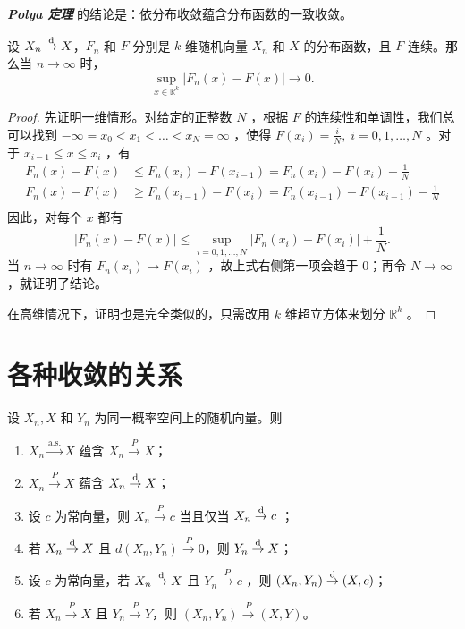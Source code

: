 \textbf{\emph{Polya 定理 }}的结论是：依分布收敛蕴含分布函数的一致收敛。

\begin{theorem}[Pólya 定理]\label{thm:ch1:polya}

\label{thm:ch1:1-5}

设 $X_n \overset{\rm d}\to X$，$F_n$ 和 $F$ 分别是 $k$ 维随机向量 $X_n$ 和 $X$ 的分布函数，且 $F$ 连续。那么当 $n \to \infty$ 时，
\[
\sup_{x\in\mathbb R^k}|F_n(x)-F(x)|\to0.
\]

\end{theorem}

\begin{proof}

先证明一维情形。对给定的正整数 $N$ ，根据 $F$ 的连续性和单调性，我们总可以找到 $-\infty= x_0<x_1<\dots<x_N=\infty$ ，使得 $F(x_i)=\frac iN,\;i=0,1,\dots,N$ 。对于 $x_{i-1}\le x\le x_i$ ，有
\[\begin{aligned} F_n(x)-F(x)&\le F_n(x_{i})-F(x_{i-1})=F_n(x_{i})-F(x_{i})+\frac 1N\\ F_n(x)-F(x)&\ge F_n(x_{i-1})-F(x_{i})=F_n(x_{i-1})-F(x_{i-1})-\frac 1N\\ \end{aligned}\]
因此，对每个 $x$ 都有 \[|F_n(x)-F(x)|\le \sup_{i=0,1,\dots,N}|F_n(x_i)-F(x_i)|+\frac1N.\]
当 $n\to\infty$ 时有 $F_n(x_i)\to F(x_i)$ ，故上式右侧第一项会趋于 0；再令 $N\to\infty$ ，就证明了结论。

在高维情况下，证明也是完全类似的，只需改用 $k$ 维超立方体来划分 $\mathbb R^k$ 。

\end{proof}

\section{各种收敛的关系}

\begin{theorem}\label{thm:ch1:convergence-relations}

\label{thm:ch1:1-6}

设 $X_n, X$ 和 $Y_n$ 为同一概率空间上的随机向量。则

\begin{enumerate}
\def\labelenumi{\arabic{enumi}.}
\tightlist
\item
  $X_n \overset{\text{a.s.}}\to X$ 蕴含 $X_n \overset P\to X$；
\item
  $X_n \overset P\to X$ 蕴含 $X_n \overset{\rm d}\to X$；
\item
  设 $c$ 为常向量，则 $X_n \overset P\to c$ 当且仅当 $X_n\overset{\rm d}\to c$ ；
\item
  若 $X_n\overset{\rm d}\to X$ 且 $d(X_n, Y_n)\overset P\to 0$，则 $Y_n\overset{\rm d}\to X$；
\item
  设 $c$ 为常向量，若 $X_n\overset{\rm d}\to X$ 且 $Y_n\overset P\to c$ ，则 $(X_n, Y_n)\overset{\rm d}\to (X, c)$；
\item
  若 $X_n\overset P\to X$ 且 $Y_n \overset P\to Y$，则 $(X_n, Y_n)\overset P\to (X, Y)$。
\end{enumerate}

\end{theorem}

